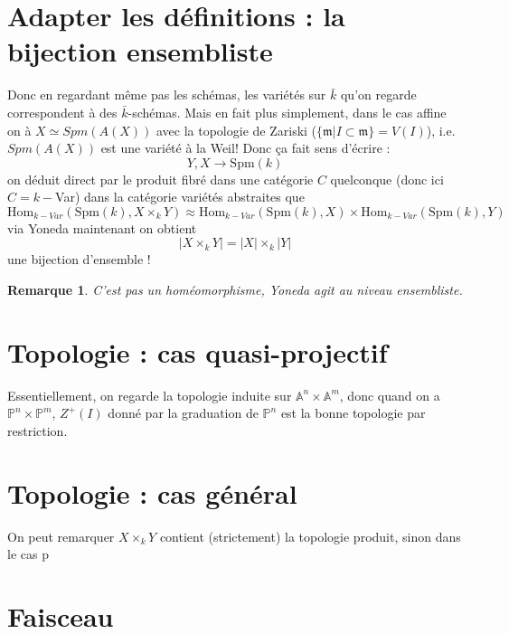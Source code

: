 \documentclass[a4paper,12pt]{book}
\newcommand{\A}{\mathbb{A}}
\newcommand{\Hom}{\textrm{Hom}}
\newcommand{\Spm}{\textrm{Spm}}
\newcommand{\m}{\mathfrak{m}}
\renewcommand{\Pr}{\mathbb{P}}
\theoremstyle{plain}
\newtheorem{rem}{Remarque}
\theoremstyle{definition}
\theoremstyle{remark}
\begin{document}
\section{Adapter les définitions : la bijection ensembliste}
Donc en regardant même pas les schémas, les variétés sur $\bar k$
qu'on regarde correspondent à des $\bar k$-schémas. Mais en 
fait plus simplement, dans le cas affine on à $X\simeq Spm(A(X))$
avec la topologie de Zariski ($\{\m|I\subset \m\}=V(I)$), i.e.
$Spm(A(X))$ est une variété à la Weil! Donc ça fait sens d'écrire :
\[Y,X\to \Spm(k)\]
on déduit direct par le produit fibré dans une catégorie $C$ 
quelconque (donc ici $C=k-$Var) dans la catégorie variétés
abstraites que
\[\Hom_{k-Var}(\Spm(k), X\times_k Y)\approx \Hom_{k-Var}(\Spm(k),X)
\times \Hom_{k-Var}(\Spm(k),Y)\]
via Yoneda maintenant on obtient 
\[|X\times_k Y|=|X|\times_k|Y|\]
une bijection d'ensemble !

\begin{rem}
  C'est pas un homéomorphisme, Yoneda agit au niveau ensembliste.
\end{rem}
\section{Topologie : cas quasi-projectif}
Essentiellement, on regarde la topologie induite sur $\A^n\times
\A^m$, donc quand on a $\Pr^n\times \Pr^m$, $Z^+(I)$ donné par 
la graduation de $\Pr^n$ est la bonne topologie par restriction.

\section{Topologie : cas général}
On peut remarquer $X\times_k Y$ contient (strictement) la topologie
produit, sinon dans le cas p
\section{Faisceau}

\printbibliography
\end{document}
